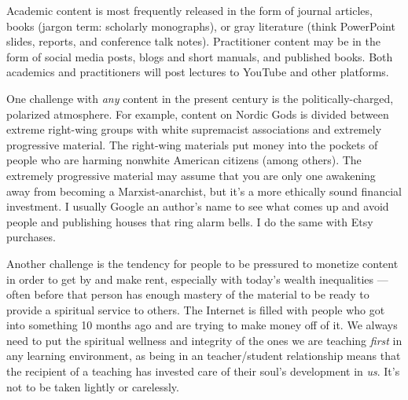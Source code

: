 \documentclass[
]{book}
\begin{document}
Academic content is most frequently released in the form of journal articles, books (jargon term: scholarly monographs), or gray literature (think PowerPoint slides, reports, and conference talk notes). Practitioner content may be in the form of social media posts, blogs and short manuals, and published books. Both academics and practitioners will post lectures to YouTube and other platforms.

One challenge with \emph{any} content in the present century is the politically-charged, polarized atmosphere. For example, content on Nordic Gods is divided between extreme right-wing groups with white supremacist associations and extremely progressive material. The right-wing materials put money into the pockets of people who are harming nonwhite American citizens (among others). The extremely progressive material may assume that you are only one awakening away from becoming a Marxist-anarchist, but it's a more ethically sound financial investment. I usually Google an author's name to see what comes up and avoid people and publishing houses that ring alarm bells. I do the same with Etsy purchases.

Another challenge is the tendency for people to be pressured to monetize content in order to get by and make rent, especially with today's wealth inequalities --- often before that person has enough mastery of the material to be ready to provide a spiritual service to others. The Internet is filled with people who got into something 10 months ago and are trying to make money off of it. We always need to put the spiritual wellness and integrity of the ones we are teaching \emph{first} in any learning environment, as being in an teacher/student relationship means that the recipient of a teaching has invested care of their soul's development in \emph{us}. It's not to be taken lightly or carelessly.
\end{document}
